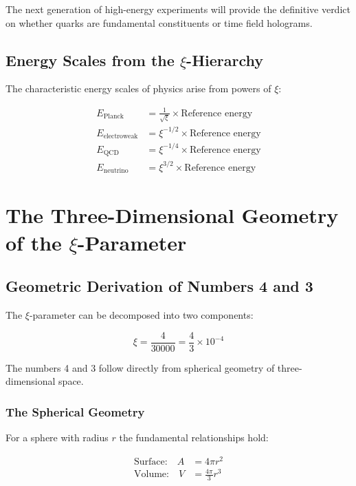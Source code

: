 \documentclass[12pt,a4paper]{report}
\begin{document}
The next generation of high-energy experiments will provide the definitive verdict on whether quarks are fundamental constituents or time field holograms.
	\subsection{Energy Scales from the $\xi$-Hierarchy}
	
	The characteristic energy scales of physics arise from powers of $\xi$:
	
	\begin{align}
		E_{\text{Planck}} &= \frac{1}{\sqrt{\xi}} \times \text{Reference energy} \\
		E_{\text{electroweak}} &= \xi^{-1/2} \times \text{Reference energy} \\
		E_{\text{QCD}} &= \xi^{-1/4} \times \text{Reference energy} \\
		E_{\text{neutrino}} &= \xi^{3/2} \times \text{Reference energy}
	\end{align}
	
	\section{The Three-Dimensional Geometry of the $\xi$-Parameter}
	
	\subsection{Geometric Derivation of Numbers 4 and 3}
	
	The $\xi$-parameter can be decomposed into two components:
	
	\begin{equation}
		\xi = \frac{4}{30000} = \frac{4}{3} \times 10^{-4}
	\end{equation}
	
	The numbers 4 and 3 follow directly from spherical geometry of three-dimensional space.
	
	\subsubsection{The Spherical Geometry}
	
	For a sphere with radius $r$ the fundamental relationships hold:
	
	\begin{align}
		\text{Surface:} \quad A &= 4\pi r^2 \\
		\text{Volume:} \quad V &= \frac{4\pi}{3} r^3
	\end{align}
	
\end{document}
